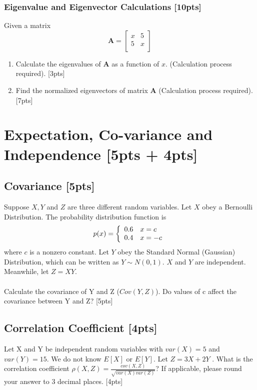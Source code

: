 \documentclass{article}
\begin{document}
\subsubsection{Eigenvalue and Eigenvector Calculations [10pts]}
Given a matrix
$$\boldsymbol{A} = \begin{bmatrix} 
    x & 5  \\ 
    5 & x \\
\end{bmatrix}$$
\begin{enumerate}[label=(\alph*)]
    \item Calculate the eigenvalues of $\boldsymbol{A}$ as a function of $x$. (Calculation process required). [3pts]
    
    \item Find the normalized eigenvectors of matrix $\boldsymbol{A}$ (Calculation process required). [7pts]
\end{enumerate}


\newpage
\section{Expectation, Co-variance and Independence [5pts + 4pts]}
\subsection{Covariance [5pts]}
Suppose $X, Y$ and $Z$ are three different random variables.
Let $X$ obey a Bernoulli Distribution. The probability distribution function is
    $$p(x)=\left\{
    \begin{array}{ c l}	
        0.6 & x = c\\
        0.4 & x = -c
    \end{array}\right.$$
where $c$ is a nonzero constant. Let $Y$ obey the Standard Normal (Gaussian) Distribution, which can be written as $Y \sim N(0,1)$. $X$ and $Y$ are independent. Meanwhile, let $Z = XY$. \\
\\
\noindent Calculate the covariance of Y and Z ($Cov(Y, Z)$). Do values of c affect the covariance between Y and Z? [5pts]


\newpage
\subsection{Correlation Coefficient [4pts]}
Let X and Y be independent random variables with $var(X) = 5$ and $var(Y ) = 15$. We do
not know $E[X]$ or $E[Y]$. Let $Z = 3X + 2Y$ . What is the correlation coefficient $\rho(X,Z)=\frac{cov(X,Z)}{\sqrt{var(X)var(Z)}}$? If applicable, please round your answer to 3 decimal places. [4pts]
\end{document}
